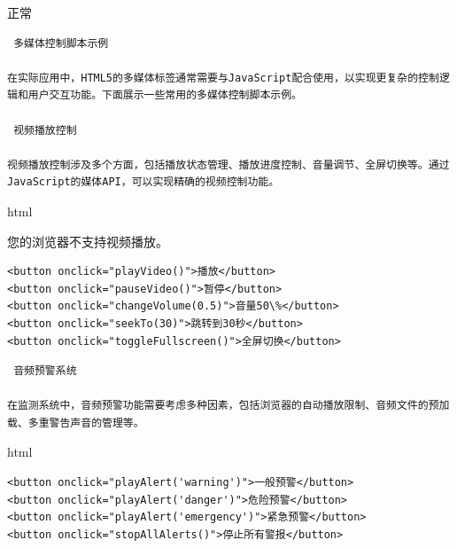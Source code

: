 正常

\begin{lstlisting}
 多媒体控制脚本示例

在实际应用中，HTML5的多媒体标签通常需要与JavaScript配合使用，以实现更复杂的控制逻辑和用户交互功能。下面展示一些常用的多媒体控制脚本示例。

 视频播放控制

视频播放控制涉及多个方面，包括播放状态管理、播放进度控制、音量调节、全屏切换等。通过JavaScript的媒体API，可以实现精确的视频控制功能。
\end{lstlisting}

html

您的浏览器不支持视频播放。

\begin{verbatim}
<button onclick="playVideo()">播放</button>
<button onclick="pauseVideo()">暂停</button>
<button onclick="changeVolume(0.5)">音量50\%</button>
<button onclick="seekTo(30)">跳转到30秒</button>
<button onclick="toggleFullscreen()">全屏切换</button>
\end{verbatim}

\begin{lstlisting}
 音频预警系统

在监测系统中，音频预警功能需要考虑多种因素，包括浏览器的自动播放限制、音频文件的预加载、多重警告声音的管理等。
\end{lstlisting}

html

\begin{verbatim}
<button onclick="playAlert('warning')">一般预警</button>
<button onclick="playAlert('danger')">危险预警</button>
<button onclick="playAlert('emergency')">紧急预警</button>
<button onclick="stopAllAlerts()">停止所有警报</button>
\end{verbatim}

